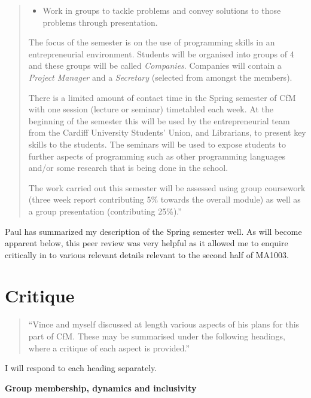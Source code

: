 \documentclass{article}
\begin{document}
\begin{quote}
\begin{itemize}
  \item Work in groups to tackle problems and convey solutions to those problems through presentation.
\end{itemize}

The focus of the semester is on the use of programming skills in an entrepreneurial environment.  Students will be organised into groups of 4 and these groups will be called \emph{Companies}. Companies will contain a \emph{Project Manager} and a \emph{Secretary} (selected from amongst the members).

There is a limited amount of contact time in the Spring semester of CfM with one session (lecture or seminar) timetabled each week. At the beginning of the semester this will be used by the entrepreneurial team from the Cardiff University Students’ Union, and Librarians, to present key skills to the students. The seminars will be used to expose students to further aspects of programming such as other programming languages and/or some research that is being done in the school.

The work carried out this semester will be assessed using group coursework (three week report contributing 5\% towards the overall module) as well as a group presentation (contributing 25\%).''

\end{quote}

Paul has summarized my description of the Spring semester well. As will become apparent below, this peer review was very helpful as it allowed me to enquire critically in to various relevant details relevant to the second half of MA1003.

\section{Critique}

\begin{quote}
``Vince and myself discussed at length various aspects of his plans for this part of CfM.  These may be  summarised under the following headings, where a critique of each aspect is provided.''
\end{quote}

I will respond to each heading separately.

\textbf{Group membership, dynamics and inclusivity}
\end{document}
